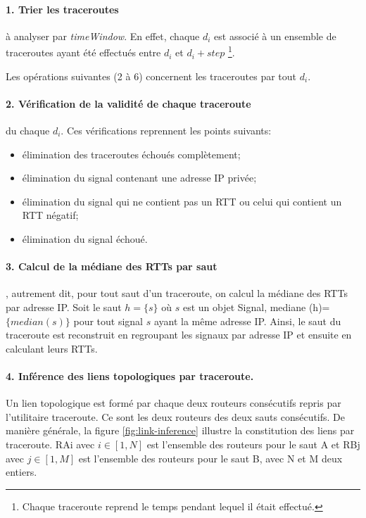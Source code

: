 \documentclass[]{report}
\begin{document}
\paragraph{1. Trier les traceroutes } à analyser par \textit{timeWindow}. En effet, chaque $d_i$ est associé à un ensemble de traceroutes ayant été effectués entre $d_i$ et $d_i + step$ \footnote{Chaque traceroute reprend le temps pendant lequel il était effectué.}. 

Les opérations suivantes (2 à 6) concernent  les traceroutes par tout $d_i$.  

\paragraph{2. Vérification de la validité de chaque traceroute } du chaque $d_i$. Ces vérifications reprennent les points suivants:
\begin{itemize}
	\item élimination des traceroutes échoués complètement;
	\item élimination du signal contenant une adresse IP privée;
	\item élimination du signal qui ne contient pas un RTT ou celui qui contient un RTT négatif;
	\item  élimination du signal échoué.
\end{itemize}

\paragraph{3. Calcul de la médiane des RTTs par saut}, autrement dit, pour tout saut d'un traceroute,  on calcul la médiane des RTTs par adresse IP. Soit le saut $h =\{s \}$ où $s$ est un objet Signal, mediane (h)= $\{ median(s)\}$  pour tout signal $s$ ayant la même adresse IP. Ainsi, le saut du traceroute est reconstruit en regroupant les signaux par adresse IP et ensuite en calculant leurs RTTs. 


\paragraph{4. Inférence des liens topologiques par traceroute.} Un lien topologique est formé par chaque deux routeurs consécutifs repris par l'utilitaire traceroute. Ce sont les deux routeurs des deux sauts consécutifs. De manière générale, la figure \ref{fig:link-inference} illustre la constitution des liens par traceroute. RAi avec $i \in [1,N]$ est l'ensemble des routeurs pour le saut A et RBj avec $j \in [1,M]$ est l'ensemble des routeurs pour le saut B, avec N et M deux entiers.
\end{document}
